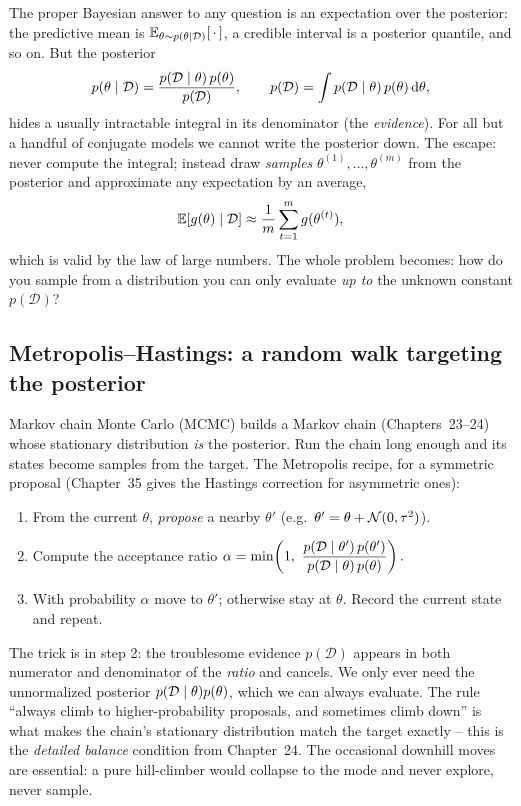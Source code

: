The proper Bayesian answer to any question is an expectation over the posterior:
the predictive mean is $\operatorname{\mathbb{E}}_{\theta\sim p(\theta\mid\mathcal{D})}[\,\cdot\,]$, a
credible interval is a posterior quantile, and so on. But the posterior
\[
  p(\theta\mid\mathcal{D}) = \frac{p(\mathcal{D}\mid\theta)\,p(\theta)}{p(\mathcal{D})},
  \qquad p(\mathcal{D}) = \int p(\mathcal{D}\mid\theta)\,p(\theta)\,\mathrm{d}\theta,
\]
hides a usually intractable integral in its denominator (the
\emph{evidence}). For all but a handful of conjugate models we cannot write the
posterior down. The escape: never compute the integral; instead draw
\emph{samples} $\theta^{(1)},\dots,\theta^{(m)}$ from the posterior and
approximate any expectation by an average,
\[
  \operatorname{\mathbb{E}}[g(\theta)\mid\mathcal{D}] \approx \frac{1}{m}\sum_{t=1}^m g(\theta^{(t)}),
\]
which is valid by the law of large numbers. The whole problem becomes: how do you
sample from a distribution you can only evaluate \emph{up to} the unknown constant
$p(\mathcal{D})$?

\subsection{Metropolis--Hastings: a random walk targeting the posterior}

Markov chain Monte Carlo (MCMC) builds a Markov chain (Chapters~23--24)
whose stationary distribution \emph{is} the posterior. Run the chain long enough
and its states become samples from the target. The Metropolis recipe, for a symmetric proposal (Chapter~35 gives the Hastings correction for asymmetric ones):

\begin{enumerate}
  \item From the current $\theta$, \emph{propose} a nearby $\theta'$ (e.g.\
  $\theta' = \theta + \mathcal{N}(0,\tau^2)$).
  \item Compute the acceptance ratio
  $\displaystyle \alpha = \min\!\left(1,\ \frac{p(\mathcal{D}\given\theta')\,p(\theta')}
       {p(\mathcal{D}\given\theta)\,p(\theta)}\right).$
  \item With probability $\alpha$ move to $\theta'$; otherwise stay at $\theta$.
  Record the current state and repeat.
\end{enumerate}

\begin{happeningbox}
The trick is in step 2: the troublesome evidence $p(\mathcal{D})$ appears in both
numerator and denominator of the \emph{ratio} and cancels. We only ever need the
unnormalized posterior $p(\mathcal{D}\mid\theta)p(\theta)$, which we can always
evaluate. The rule ``always climb to higher-probability proposals, and sometimes
climb down'' is what makes the chain's stationary distribution match the target
exactly -- this is the \emph{detailed balance} condition from
Chapter~24. The occasional downhill moves are essential: a pure hill-climber would
collapse to the mode and never explore, never sample.
\end{happeningbox}

